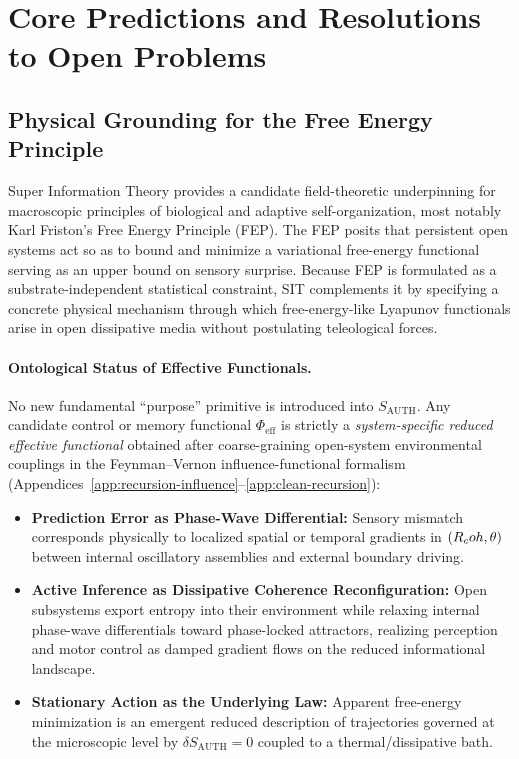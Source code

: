 \section{Core Predictions and Resolutions to Open Problems}
\label{sec:core-predictions-open}

\subsection{Physical Grounding for the Free Energy Principle}

Super Information Theory provides a candidate field-theoretic underpinning for macroscopic principles of biological and adaptive self-organization, most notably Karl Friston's Free Energy Principle (FEP). The FEP posits that persistent open systems act so as to bound and minimize a variational free-energy functional serving as an upper bound on sensory surprise. Because FEP is formulated as a substrate-independent statistical constraint, SIT complements it by specifying a concrete physical mechanism through which free-energy-like Lyapunov functionals arise in open dissipative media without postulating teleological forces.

\paragraph{Ontological Status of Effective Functionals.}
No new fundamental ``purpose'' primitive is introduced into $S_{\mathrm{AUTH}}$. Any candidate control or memory functional $\Phi_{\mathrm{eff}}$ is strictly a \emph{system-specific reduced effective functional} obtained after coarse-graining open-system environmental couplings in the Feynman--Vernon influence-functional formalism (Appendices~\ref{app:recursion-influence}--\ref{app:clean-recursion}):
\begin{itemize}
  \item \textbf{Prediction Error as Phase-Wave Differential:} Sensory mismatch corresponds physically to localized spatial or temporal gradients in $(R_coh, \theta)$ between internal oscillatory assemblies and external boundary driving.
  \item \textbf{Active Inference as Dissipative Coherence Reconfiguration:} Open subsystems export entropy into their environment while relaxing internal phase-wave differentials toward phase-locked attractors, realizing perception and motor control as damped gradient flows on the reduced informational landscape.
  \item \textbf{Stationary Action as the Underlying Law:} Apparent free-energy minimization is an emergent reduced description of trajectories governed at the microscopic level by $\delta S_{\mathrm{AUTH}} = 0$ coupled to a thermal/dissipative bath.
\end{itemize}

